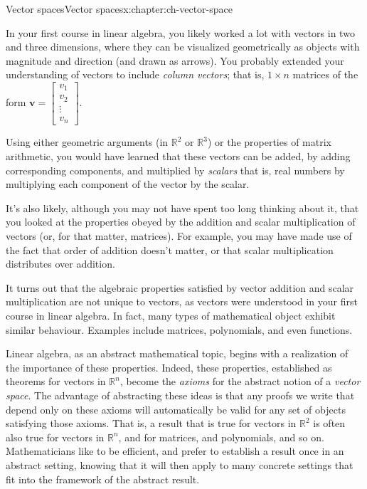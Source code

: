 \documentclass[oneside,10pt,]{book}
\numberwithin{equation}{section}
\newcommand{\bbm}{\begin{bmatrix}}
\newcommand{\ebm}{\end{bmatrix}}
\newcommand{\R}{\mathbb{R}}
\newcommand{\vv}{\mathbf{v}}
\begin{document}
\setcounter{tocdepth}{1}
\renewcommand*\contentsname{Contents}
\tableofcontents
\mainmatter
%
%
\typeout{************************************************}
\typeout{************************************************}
%
\begin{chapterptx}{Vector spaces}{}{Vector spaces}{}{}{x:chapter:ch-vector-space}
\begin{introduction}{}%
In your first course in linear algebra, you likely worked a lot with vectors in two and three dimensions, where they can be visualized geometrically as objects with magnitude and direction (and drawn as arrows). You probably extended your understanding of vectors to include \emph{column vectors}; that is, \(1\times n\) matrices of the form \(\vv=\bbm v_1\\v_2\\\vdots\\v_n\ebm\).%
\par
Using either geometric arguments (in \(\R^2\) or \(\R^3\)) or the properties of matrix arithmetic, you would have learned that these vectors can be added, by adding corresponding components, and multiplied by \emph{scalars} \textemdash{} that is, real numbers \textemdash{} by multiplying each component of the vector by the scalar.%
\par
It's also likely, although you may not have spent too long thinking about it, that you looked at the properties obeyed by the addition and scalar multiplication of vectors (or, for that matter, matrices). For example, you may have made use of the fact that order of addition doesn't matter, or that scalar multiplication distributes over addition.%
\par
It turns out that the algebraic properties satisfied by vector addition and scalar multiplication are not unique to vectors, as vectors were understood in your first course in linear algebra. In fact, many types of mathematical object exhibit similar behaviour. Examples include matrices, polynomials, and even functions.%
\par
Linear algebra, as an abstract mathematical topic, begins with a realization of the importance of these properties. Indeed, these properties, established as theorems for vectors in \(\R^n\), become the \emph{axioms} for the abstract notion of a \emph{vector space}. The advantage of abstracting these ideas is that any proofs we write that depend only on these axioms will automatically be valid for any set of objects satisfying those axioms. That is, a result that is true for vectors in \(\R^2\) is often also true for vectors in \(\R^n\), and for matrices, and polynomials, and so on. Mathematicians like to be efficient, and prefer to establish a result once in an abstract setting, knowing that it will then apply to many concrete settings that fit into the framework of the abstract result.%

\end{introduction}
\end{chapterptx}
\end{document}
